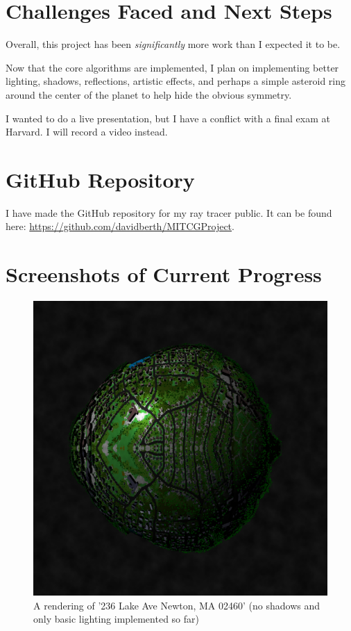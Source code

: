 \documentclass{amsart}
\begin{document}
\section{Challenges Faced and Next Steps}
Overall, this project has been \emph{significantly} more work than I expected it to be. 

Now that the core algorithms are implemented, I plan on implementing better lighting, shadows, reflections, artistic effects, and perhaps a simple asteroid ring around the center of the planet to help hide the obvious symmetry.

I wanted to do a live presentation, but I have a conflict with a final exam at Harvard. I will record a video instead.

\section{GitHub Repository}

I have made the GitHub repository for my ray tracer public. It can be found here: \url{https://github.com/davidberth/MITCGProject}.


\section{Screenshots of Current Progress}


\begin{figure}[H]
      \caption{A rendering of '236 Lake Ave Newton, MA 02460' (no shadows and only basic lighting implemented so far)}
      \begin{center}
            \includegraphics[width=5.5in]{../results/r1.png}
      \end{center}
\end{figure}
\end{document}
